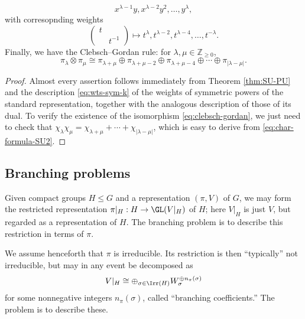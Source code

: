 \documentclass[reqno]{amsart} 
\begin{document}
\begin{theorem}
\begin{equation}
  x^{\lambda-1} y,
  x^{\lambda-2} y^2,
  \dotsc,
  y^{\lambda},
\end{equation}
with corresopnding weights
\begin{equation}\label{eq:}
  \begin{pmatrix}
    t &  \\
      & t^{-1}
  \end{pmatrix}
  \mapsto
  t^{\lambda}, t^{\lambda-2},
  t^{\lambda-4},
  \dotsc,
  t^{-\lambda}.
\end{equation}
Finally, we have the Clebsch--Gordan rule: for $\lambda, \mu \in \mathbb{Z}_{\geq 0}$,
\begin{equation}\label{eq:clebsch-gordan}
  \pi_{\lambda}
  \otimes \pi_{\mu}
  \cong \pi_{\lambda+\mu}
  \oplus
  \pi_{\lambda+\mu-2}
  \oplus
  \pi_{\lambda+\mu-4}
  \oplus
  \dotsb 
  \oplus
  \pi_{|\lambda-\mu|}.
\end{equation}
\end{theorem}
\begin{proof}
  Almost every assertion follows immediately from Theorem \ref{thm:SU-PU} and the description \eqref{eq:wts-sym-k} of the weights of symmetric powers of the standard representation, together with the analogous description of those of its dual.  To verify the existence of the isomorphism \eqref{eq:clebsch-gordan}, we just need to check that $\chi_\lambda \chi_\mu = \chi_{\lambda+\mu} + \dotsb + \chi_{|\lambda-\mu|}$, which is easy to derive from \eqref{eq:char-formula-SU2}.
\end{proof}

\subsection{Branching problems}
Given compact groups $H \leq G$ and a representation $(\pi,V)$ of $G$, we may form the restricted representation $\pi|_{H} : H \rightarrow \GL(V|_{H})$ of $H$; here $V|_{H}$ is just $V$, but regarded as a representation of $H$.  The branching problem is to describe this restriction in terms of $\pi$.

We assume henceforth that $\pi$ is irreducible.  Its restriction is then ``typically'' not irreducible, but may in any event be decomposed as
\begin{equation}\label{eq:}
  V|_{H}
  \cong \oplus_{\sigma \in \Irr(H)}
  W_\sigma ^{\oplus n_\pi(\sigma)}
\end{equation}
for some nonnegative integers $n_\pi(\sigma)$, called ``branching coefficients.''  The problem is to describe these.
\end{document}
